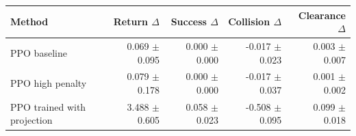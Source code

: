 \begin{tabular}{lrrrr}
\toprule
Method & Return $\Delta$ & Success $\Delta$ & Collision $\Delta$ & Clearance $\Delta$ \\
\midrule
PPO baseline & 0.069 $\pm$ 0.095 & 0.000 $\pm$ 0.000 & -0.017 $\pm$ 0.023 & 0.003 $\pm$ 0.007 \\
PPO high penalty & 0.079 $\pm$ 0.178 & 0.000 $\pm$ 0.000 & -0.017 $\pm$ 0.037 & 0.001 $\pm$ 0.002 \\
PPO trained with projection & 3.488 $\pm$ 0.605 & 0.058 $\pm$ 0.023 & -0.508 $\pm$ 0.095 & 0.099 $\pm$ 0.018 \\
\bottomrule
\end{tabular}
